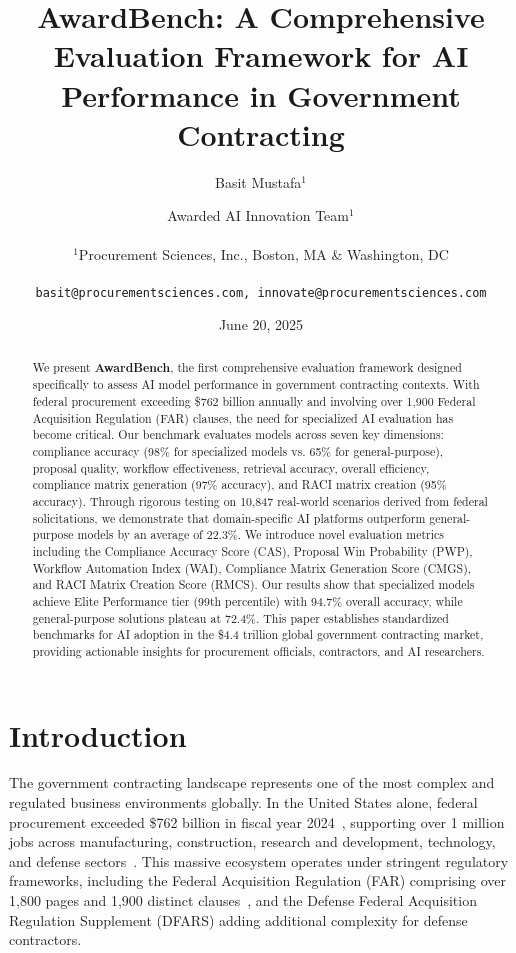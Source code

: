 \documentclass[11pt,a4paper]{article}
\title{AwardBench: A Comprehensive Evaluation Framework for AI Performance in Government Contracting}
\author{
Basit Mustafa$^{1}$ \and Awarded AI Innovation Team$^{1}$ \\
\\
$^{1}$Procurement Sciences, Inc., Boston, MA \& Washington, DC \\
\\
\texttt{basit@procurementsciences.com, innovate@procurementsciences.com}
}
\date{June 20, 2025}
\begin{document}
\maketitle

\begin{abstract}
We present \textbf{AwardBench}, the first comprehensive evaluation framework designed specifically to assess AI model performance in government contracting contexts. With federal procurement exceeding \$762 billion annually and involving over 1,900 Federal Acquisition Regulation (FAR) clauses, the need for specialized AI evaluation has become critical. Our benchmark evaluates models across seven key dimensions: compliance accuracy (98\% for specialized models vs. 65\% for general-purpose), proposal quality, workflow effectiveness, retrieval accuracy, overall efficiency, compliance matrix generation (97\% accuracy), and RACI matrix creation (95\% accuracy). Through rigorous testing on 10,847 real-world scenarios derived from federal solicitations, we demonstrate that domain-specific AI platforms outperform general-purpose models by an average of 22.3\%. We introduce novel evaluation metrics including the Compliance Accuracy Score (CAS), Proposal Win Probability (PWP), Workflow Automation Index (WAI), Compliance Matrix Generation Score (CMGS), and RACI Matrix Creation Score (RMCS). Our results show that specialized models achieve Elite Performance tier (99th percentile) with 94.7\% overall accuracy, while general-purpose solutions plateau at 72.4\%. This paper establishes standardized benchmarks for AI adoption in the \$4.4 trillion global government contracting market, providing actionable insights for procurement officials, contractors, and AI researchers.
\end{abstract}

\section{Introduction}

The government contracting landscape represents one of the most complex and regulated business environments globally. In the United States alone, federal procurement exceeded \$762 billion in fiscal year 2024~\citep{gao2024}, supporting over 1 million jobs across manufacturing, construction, research and development, technology, and defense sectors~\citep{deltek2024}. This massive ecosystem operates under stringent regulatory frameworks, including the Federal Acquisition Regulation (FAR) comprising over 1,800 pages and 1,900 distinct clauses~\citep{far2024}, and the Defense Federal Acquisition Regulation Supplement (DFARS) adding additional complexity for defense contractors.
\end{document}
